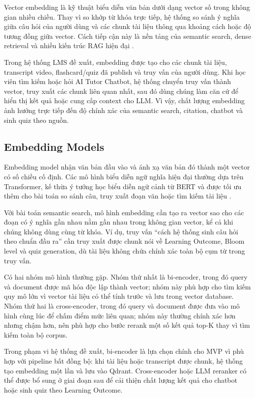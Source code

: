 Vector embedding là kỹ thuật biểu diễn văn bản dưới dạng vector số trong không
gian nhiều chiều. Thay vì so khớp từ khóa trực tiếp, hệ thống so sánh ý nghĩa
giữa câu hỏi của người dùng và các chunk tài liệu thông qua khoảng cách hoặc độ
tương đồng giữa vector. Cách tiếp cận này là nền tảng của semantic search, dense
retrieval và nhiều kiến trúc RAG hiện đại \cite{karpukhin2020dpr,lewis2020rag}.

Trong hệ thống LMS đề xuất, embedding được tạo cho các chunk tài liệu, transcript
video, flashcard/quiz đã publish và truy vấn của người dùng. Khi học viên tìm
kiếm hoặc hỏi AI Tutor Chatbot, hệ thống chuyển truy vấn thành vector, truy xuất
các chunk liên quan nhất, sau đó dùng chúng làm căn cứ để hiển thị kết quả hoặc
cung cấp context cho LLM. Vì vậy, chất lượng embedding ảnh hưởng trực tiếp đến
độ chính xác của semantic search, citation, chatbot và sinh quiz theo nguồn.

\subsection{Embedding Models}
\label{subsec:embedding-models}

Embedding model nhận văn bản đầu vào và ánh xạ văn bản đó thành một vector có
số chiều cố định. Các mô hình biểu diễn ngữ nghĩa hiện đại thường dựa trên
Transformer, kế thừa ý tưởng học biểu diễn ngữ cảnh từ BERT và được tối ưu thêm
cho bài toán so sánh câu, truy xuất đoạn văn hoặc tìm kiếm tài liệu
\cite{devlin2019bert,reimers2019sbert}.

Với bài toán semantic search, mô hình embedding cần tạo ra vector sao cho các
đoạn có ý nghĩa gần nhau nằm gần nhau trong không gian vector, kể cả khi chúng
không dùng cùng từ khóa. Ví dụ, truy vấn ``cách hệ thống sinh câu hỏi theo chuẩn
đầu ra'' cần truy xuất được chunk nói về Learning Outcome, Bloom level và quiz
generation, dù tài liệu không chứa chính xác toàn bộ cụm từ trong truy vấn.

Có hai nhóm mô hình thường gặp. Nhóm thứ nhất là bi-encoder, trong đó query và
document được mã hóa độc lập thành vector; nhóm này phù hợp cho tìm kiếm quy mô
lớn vì vector tài liệu có thể tính trước và lưu trong vector database. Nhóm thứ
hai là cross-encoder, trong đó query và document được đưa vào mô hình cùng lúc
để chấm điểm mức liên quan; nhóm này thường chính xác hơn nhưng chậm hơn, nên
phù hợp cho bước rerank một số kết quả top-K thay vì tìm kiếm toàn bộ corpus.

Trong phạm vi hệ thống đề xuất, bi-encoder là lựa chọn chính cho MVP vì phù hợp
với pipeline bất đồng bộ: khi tài liệu hoặc transcript được chunk, hệ thống tạo
embedding một lần và lưu vào Qdrant. Cross-encoder hoặc LLM reranker có thể được
bổ sung ở giai đoạn sau để cải thiện chất lượng kết quả cho chatbot hoặc sinh
quiz theo Learning Outcome.

